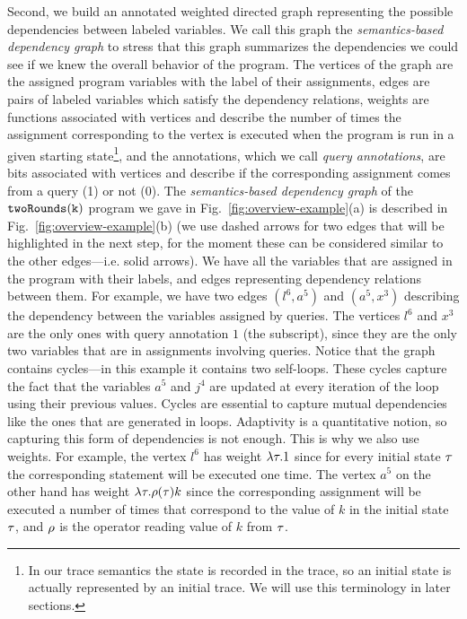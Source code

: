 Second, we build an annotated weighted directed graph representing the possible dependencies between labeled variables. We call this graph the \emph{semantics-based dependency graph} to stress that this graph summarizes the dependencies we could see if we knew the overall behavior of the program. 
The vertices of the graph are the assigned program variables with the label of their assignments, edges are pairs of labeled variables which satisfy the dependency relations, weights are functions associated with vertices and describe the number of times the assignment corresponding to the vertex is executed when the program is run in a given starting state\footnote{In our trace semantics the state is recorded in the trace, so an initial state is actually represented by an initial trace. We will use this terminology in later sections.}, and the annotations, which we call \emph{query annotations}, are bits associated with vertices and describe if the corresponding assignment comes from a query (1) or not (0).
The \emph{semantics-based dependency graph} of the $\mathtt{twoRounds(k)}$ program
we gave in Fig.~\ref{fig:overview-example}(a) is described in Fig.~\ref{fig:overview-example}(b) (we use dashed arrows for two edges that will be highlighted in the next step, for the moment these can be considered similar to the other edges---i.e. solid arrows).
We have all the variables that are assigned in the program with their labels, and edges representing dependency relations between them. 
For example, we have two edges $(l^6, a^5)$ and $(a^5, x^3)$ describing the dependency between the variables assigned by queries. The vertices $l^6$ and $x^3$ are the only ones with query annotation $1$ (the subscript), since they are the only two variables that are in assignments involving  queries. Notice that the graph contains cycles---in this example it contains two self-loops. These cycles capture the fact that the variables $a^5$ and $j^4$ are updated at every iteration of the loop using their previous values. Cycles are essential to capture mutual dependencies like the ones that are generated in loops. Adaptivity is a quantitative notion, so capturing this form of dependencies is not enough. 
This is why we also use weights. 
For example, the vertex $l^{6}$ has weight {$\lambda \mathtt{\tau}.1$} since for every initial state {$\mathtt{\tau}$} the corresponding statement will be executed one time. The vertex $a^5$ on the other hand has weight {$\lambda \mathtt{\tau}. \rho(\mathtt{\tau}) k$ since the corresponding assignment will be executed a number of times that correspond to the value of $k$ in the initial state $\mathtt{\tau}$, and $\rho$ is the operator reading value of $k$ from $\mathtt{\tau}$.
}

